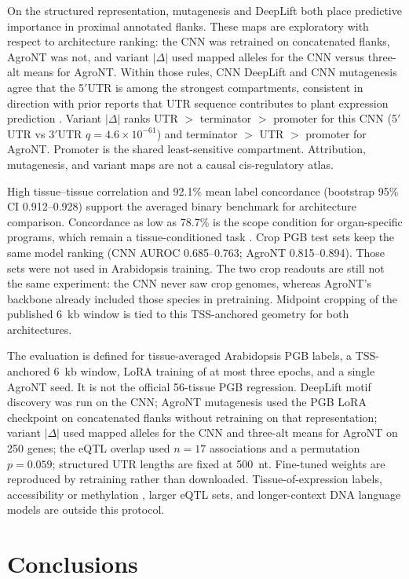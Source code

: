\documentclass[9pt,twocolumn,twoside,lineno]{gsag3jnl}
\begin{document}
On the structured representation, mutagenesis and DeepLift both place predictive importance in proximal annotated flanks. These maps are exploratory with respect to architecture ranking: the CNN was retrained on concatenated flanks, AgroNT was not, and variant $|\Delta|$ used mapped alleles for the CNN versus three-alt means for AgroNT. Within those rules, CNN DeepLift and CNN mutagenesis agree that the 5$'$UTR is among the strongest compartments, consistent in direction with prior reports that UTR sequence contributes to plant expression prediction \citep{peleke2024}. Variant $|\Delta|$ ranks UTR $>$ terminator $>$ promoter for this CNN (5$'$UTR vs 3$'$UTR $q=4.6\times10^{-61}$) and terminator $>$ UTR $>$ promoter for AgroNT. Promoter is the shared least-sensitive compartment. Attribution, mutagenesis, and variant maps are not a causal cis-regulatory atlas.

High tissue--tissue correlation and 92.1\% mean label concordance (bootstrap 95\% CI 0.912--0.928) support the averaged binary benchmark for architecture comparison. Concordance as low as 78.7\% is the scope condition for organ-specific programs, which remain a tissue-conditioned task \citep{peleke2024}. Crop PGB test sets keep the same model ranking (CNN AUROC 0.685--0.763; AgroNT 0.815--0.894). Those sets were not used in Arabidopsis training. The two crop readouts are still not the same experiment: the CNN never saw crop genomes, whereas AgroNT's backbone already included those species in pretraining. Midpoint cropping of the published 6~kb window is tied to this TSS-anchored geometry for both architectures.

The evaluation is defined for tissue-averaged Arabidopsis PGB labels, a TSS-anchored 6~kb window, LoRA training of at most three epochs, and a single AgroNT seed. It is not the official 56-tissue PGB regression. DeepLift motif discovery was run on the CNN; AgroNT mutagenesis used the PGB LoRA checkpoint on concatenated flanks without retraining on that representation; variant $|\Delta|$ used mapped alleles for the CNN and three-alt means for AgroNT on 250 genes; the eQTL overlap used $n=17$ associations and a permutation $p=0.059$; structured UTR lengths are fixed at 500~nt. Fine-tuned weights are reproduced by retraining rather than downloaded. Tissue-of-expression labels, accessibility or methylation \citep{omalley2016,takou2025}, larger eQTL sets, and longer-context DNA language models \citep{avsec2021} are outside this protocol.

\section{Conclusions}
\end{document}

